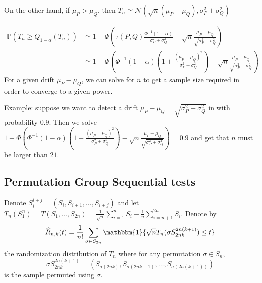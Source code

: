 \documentclass{article}
\theoremstyle{plain}
\theoremstyle{remark}
\renewcommand{\P}{\mathbb{P}}
\newcommand{\1}{\mathbbm{1}}
\numberwithin{equation}{section}
\begin{document}
On the other hand, if $\mu_P > \mu_Q$, then $T_n \simeq \mathcal{N}(\sqrt{n}(\mu_P-\mu_Q),\sigma_P^2+\sigma_Q^2 ) $

\begin{align*}
\P\left( T_n \ge Q_{1-\alpha}(T_n)\right)&\simeq  1-\Phi\left(\tau(P,Q)\frac{\Phi^{-1}(1-\alpha)}{\sigma_P^2+\sigma_Q^2 }-  \sqrt{n}\frac{\mu_P-\mu_Q}{\sqrt{\sigma_P^2+\sigma_Q^2}} \right)  \\
&\simeq  1-\Phi\left(\Phi^{-1}(1-\alpha)\left(1+\frac{(\mu_P-\mu_Q)^2}{\sigma_P^2+\sigma_Q^2 }\right)-  \sqrt{n}\frac{\mu_P-\mu_Q}{\sqrt{\sigma_P^2+\sigma_Q^2}} \right)
\end{align*}
For a given drift $\mu_P-\mu_Q$, we can solve for $n$ to get a sample size required in order to converge to a given power.

Example: suppose we want to detect a drift $\mu_P-\mu_Q=\sqrt{\sigma_P^2+\sigma_Q^2}$ in with probability $0.9$. Then we solve $1-\Phi\left(\Phi^{-1}(1-\alpha)\left(1+\frac{(\mu_P-\mu_Q)^2}{\sigma_P^2+\sigma_Q^2 }\right)-  \sqrt{n}\frac{\mu_P-\mu_Q}{\sqrt{\sigma_P^2+\sigma_Q^2}} \right) = 0.9$ and get that $n$ must be larger than $21$.

\subsection{Permutation Group Sequential tests}

Denote $S_{i}^{i+j}=(S_i, S_{i+1},\dots, S_{i+j})$ and let $T_n(S_1^n)=T(S_1,\dots,S_{2n})=\frac{1}{\sqrt{n}}\sum_{i=1}^n S_i -\frac{1}{n}\sum_{i=n+1}^{2n} S_i$. Denote by
$$\widehat{R}_{n,k}(t)=\frac{1}{n!}\sum_{\sigma \in S_{2n}} \1\{\sqrt{n}T_n(\sigma S_{2nk}^{2n(k+1)}) \le t\} $$
the randomization distribution of $T_n$ where for any permutation $\sigma \in S_n$,
$$\sigma S_{2nk}^{2n(k+1)}=(S_{\sigma(2nk)},S_{\sigma(2nk+1)},\dots,S_{\sigma(2n(k+1))})$$
is the sample permuted using $ \sigma$.
\end{document}
